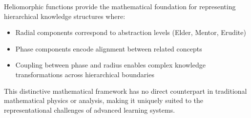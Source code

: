 \begin{tcolorbox}[colback=TheoremBlue, colframe=DarkSkyBlue, title=Fundamental Connection, fonttitle=\bfseries\large]
Heliomorphic functions provide the mathematical foundation for representing hierarchical knowledge structures where:
\begin{itemize}
    \item Radial components correspond to abstraction levels (Elder, Mentor, Erudite)
    \item Phase components encode alignment between related concepts
    \item Coupling between phase and radius enables complex knowledge transformations across hierarchical boundaries
\end{itemize}
\end{tcolorbox}

This distinctive mathematical framework has no direct counterpart in traditional mathematical physics or analysis, making it uniquely suited to the representational challenges of advanced learning systems.